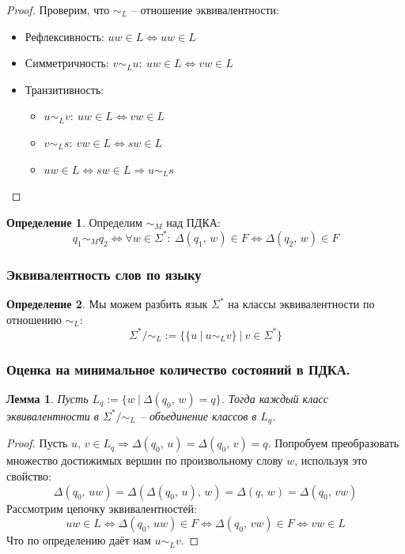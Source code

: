 \documentclass[a4paper,12pt]{article}
\theoremstyle{plain}
\newtheorem{lemma}{Лемма}[subsection]
\theoremstyle{definition}
\newtheorem{definition}{Определение}[subsection]
\theoremstyle{remark}
\begin{document}
\begin{proof}
	Проверим, что $\sim_L$ -- отношение эквивалентности:
	\begin{itemize}
		\item Рефлексивность: $uw \in L \Leftrightarrow uw \in L$
		\item Симметричность: $v \sim_L u:\: uw \in L \Leftrightarrow vw \in L$
		\item Транзитивность:
		      \begin{itemize}
			      \item $u \sim_L v :\: uw \in L \Leftrightarrow vw \in L$
			      \item $v \sim_L s :\: vw \in L \Leftrightarrow sw \in L$
			      \item $uw \in L \Leftrightarrow sw \in L \Rightarrow u \sim_L s$
		      \end{itemize}
	\end{itemize}
\end{proof}

\begin{definition}
	Определим $\sim_M$ над ПДКА:
	\[
		q_1 \sim_M q_2 \Leftrightarrow \forall w \in \Sigma^* :\: \Delta(q_1,\, w) \in F \Leftrightarrow \Delta(q_2,\, w) \in F
	\]
\end{definition}

\subsubsection*{Эквивалентность слов по языку}
\begin{definition}
	Мы можем разбить язык $\Sigma^*$ на классы эквивалентности по отношению $\sim_L$:
	\[
		\Sigma^* / \sim_L := \{\{u \:|\: u \sim_L v\} \:|\: v \in \Sigma^*\}
	\]
\end{definition}

\subsubsection*{Оценка на минимальное количество состояний в ПДКА.}
\begin{lemma}
	Пусть $L_q := \{w \:|\: \Delta(q_0,\, w) = q\}$. Тогда каждый класс эквивалентности в $\Sigma^* / \sim_L$ -- объединение классов в $L_q$.
\end{lemma}

\begin{proof}
	Пусть $u,\, v \in L_q \Rightarrow \Delta(q_0,\, u) = \Delta(q_0,\, v) = q$. Попробуем преобразовать множество достижимых вершин по произвольному слову $w$, используя это свойство:
	\[
		\Delta(q_0,\, uw) = \Delta(\Delta(q_0,\, u),\, w) = \Delta(q,\, w) = \Delta(q_0,\, vw)
	\]
	Рассмотрим цепочку эквивалентностей:
	\[
		uw \in L \Leftrightarrow \Delta(q_0,\, uw) \in F \Leftrightarrow \Delta(q_0,\, vw) \in F \Leftrightarrow vw \in L
	\]
	Что по определению даёт нам $u \sim_L v$.
\end{proof}
\end{document}

